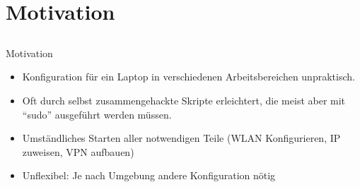 \section{Motivation}
\subsection{}
\begin{frame}[<+-| alert@+>]{Motivation}
	\begin{itemize}
		\item Konfiguration für ein Laptop in verschiedenen Arbeitsbereichen unpraktisch. \\
		\item Oft durch selbst zusammengehackte Skripte erleichtert, die meist aber mit ``sudo'' ausgeführt werden müssen.
		\item Umständliches Starten aller notwendigen Teile (WLAN Konfigurieren, IP zuweisen, VPN aufbauen)
		\item Unflexibel: Je nach Umgebung andere Konfiguration nötig
	\end{itemize}
\end{frame}

